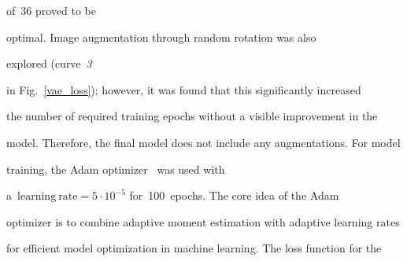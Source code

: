 
            



\noindent 

 of~36 proved to be 

optimal. Image augmentation through random rotation was also

explored (curve~\textit{3} 

in Fig.~\ref{vae_loss}); however, it was found that this significantly increased 

the number of required training epochs without a visible improvement in the 

model. Therefore, the final model does not include any augmentations. For model 

training, the Adam optimizer~\cite{kingma2017adam} was used with 

a~$\mathrm{learning~rate} = 5 \cdot 10^{-5}$ for~100~epochs. The core idea of the Adam 

optimizer is to combine adaptive moment estimation with adaptive learning rates 

for efficient model optimization in machine learning. The loss function for the 

